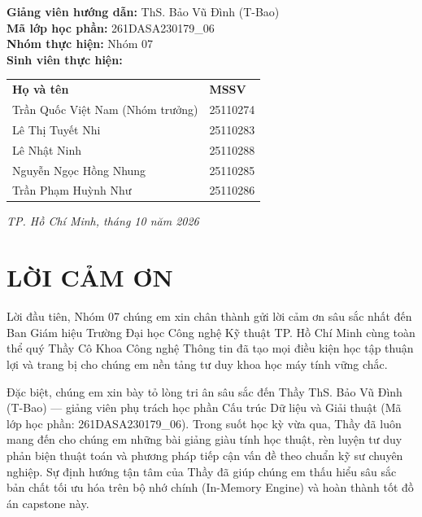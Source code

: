 \documentclass[14pt,a4paper]{extarticle}
\begin{document}
\begin{titlepage}
    \fontsize{14pt}{17pt}\selectfont
    \begin{flushleft}
        \hspace{1.2cm}\textbf{Giảng viên hướng dẫn:} ThS. Bảo Vũ Đình (T-Bao)\\[0.15cm]
        \hspace{1.2cm}\textbf{Mã lớp học phần:} 261DASA230179\_06\\[0.15cm]
        \hspace{1.2cm}\textbf{Nhóm thực hiện:} Nhóm 07\\[0.15cm]
        \hspace{1.2cm}\textbf{Sinh viên thực hiện:}\\[0.1cm]
        \hspace{1.5cm}\begin{tabular}{ll}
            \textbf{Họ và tên} & \textbf{MSSV} \\
            Trần Quốc Việt Nam (Nhóm trưởng) & 25110274 \\
            Lê Thị Tuyết Nhi & 25110283 \\
            Lê Nhật Ninh & 25110288 \\
            Nguyễn Ngọc Hồng Nhung & 25110285 \\
            Trần Phạm Huỳnh Như & 25110286 \\
        \end{tabular}
    \end{flushleft}

    \vfill
    \fontsize{14pt}{17pt}\selectfont
    \textit{TP. Hồ Chí Minh, tháng 10 năm 2026}
\end{titlepage}

\newpage
\thispagestyle{empty}
\section*{LỜI CẢM ƠN}

Lời đầu tiên, Nhóm 07 chúng em xin chân thành gửi lời cảm ơn sâu sắc nhất đến Ban Giám hiệu Trường Đại học Công nghệ Kỹ thuật TP. Hồ Chí Minh cùng toàn thể quý Thầy Cô Khoa Công nghệ Thông tin đã tạo mọi điều kiện học tập thuận lợi và trang bị cho chúng em nền tảng tư duy khoa học máy tính vững chắc.

Đặc biệt, chúng em xin bày tỏ lòng tri ân sâu sắc đến Thầy ThS. Bảo Vũ Đình (T-Bao) --- giảng viên phụ trách học phần Cấu trúc Dữ liệu và Giải thuật (Mã lớp học phần: 261DASA230179\_06). Trong suốt học kỳ vừa qua, Thầy đã luôn mang đến cho chúng em những bài giảng giàu tính học thuật, rèn luyện tư duy phản biện thuật toán và phương pháp tiếp cận vấn đề theo chuẩn kỹ sư chuyên nghiệp. Sự định hướng tận tâm của Thầy đã giúp chúng em thấu hiểu sâu sắc bản chất tối ưu hóa trên bộ nhớ chính (In-Memory Engine) và hoàn thành tốt đồ án capstone này.
\end{document}
